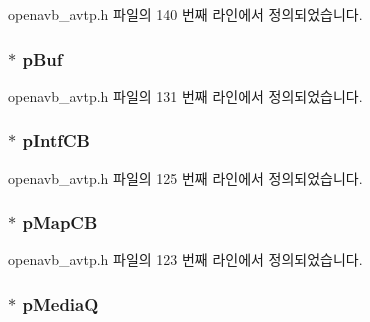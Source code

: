 openavb\+\_\+avtp.\+h 파일의 140 번째 라인에서 정의되었습니다.

\subsubsection[{\texorpdfstring{p\+Buf}{pBuf}}]{$\ast$ p\+Buf}\hypertarget{structavtp__stream__t_afedd920ccfd825275dcb5246a3c505d4}{}\label{structavtp__stream__t_afedd920ccfd825275dcb5246a3c505d4}


openavb\+\_\+avtp.\+h 파일의 131 번째 라인에서 정의되었습니다.

\subsubsection[{\texorpdfstring{p\+Intf\+CB}{pIntfCB}}]{$\ast$ p\+Intf\+CB}\hypertarget{structavtp__stream__t_a437f354862480a1e88dbf887decb189a}{}\label{structavtp__stream__t_a437f354862480a1e88dbf887decb189a}


openavb\+\_\+avtp.\+h 파일의 125 번째 라인에서 정의되었습니다.

\subsubsection[{\texorpdfstring{p\+Map\+CB}{pMapCB}}]{$\ast$ p\+Map\+CB}\hypertarget{structavtp__stream__t_ae26c54ab64456a99f94f3421e1d01960}{}\label{structavtp__stream__t_ae26c54ab64456a99f94f3421e1d01960}


openavb\+\_\+avtp.\+h 파일의 123 번째 라인에서 정의되었습니다.

\subsubsection[{\texorpdfstring{p\+MediaQ}{pMediaQ}}]{$\ast$ p\+MediaQ}\hypertarget{structavtp__stream__t_a19b6a37a9e1222c5c08444ea175d6a45}{}\label{structavtp__stream__t_a19b6a37a9e1222c5c08444ea175d6a45}


